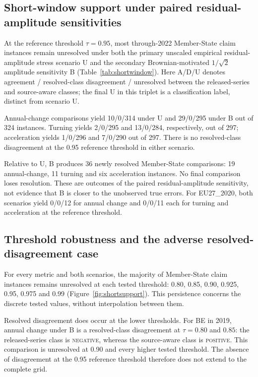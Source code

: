 

\subsection{Short-window support under paired residual-amplitude sensitivities}

At the reference threshold $\tau=0.95$, most through-2022 Member-State claim instances remain unresolved under both the primary unscaled empirical residual-amplitude stress scenario U and the secondary Brownian-motivated $1/\sqrt{2}$ amplitude sensitivity B (Table~\ref{tab:shortwindow}). Here A/D/U denotes agreement / resolved-class disagreement / unresolved between the released-series and source-aware classes; the final U in this triplet is a classification label, distinct from scenario U.

Annual-change comparisons yield 10/0/314 under U and 29/0/295 under B out of 324 instances. Turning yields 2/0/295 and 13/0/284, respectively, out of 297; acceleration yields 1/0/296 and 7/0/290 out of 297. There is no resolved-class disagreement at the 0.95 reference threshold in either scenario.

Relative to U, B produces 36 newly resolved Member-State comparisons: 19 annual-change, 11 turning and six acceleration instances. No final comparison loses resolution. These are outcomes of the paired residual-amplitude sensitivity, not evidence that B is closer to the unobserved true errors. For EU27\_2020, both scenarios yield 0/0/12 for annual change and 0/0/11 each for turning and acceleration at the reference threshold.



\subsection{Threshold robustness and the adverse resolved-disagreement case}

For every metric and both scenarios, the majority of Member-State claim instances remains unresolved at each tested threshold: 0.80, 0.85, 0.90, 0.925, 0.95, 0.975 and 0.99 (Figure~\ref{fig:shortsupport}). This persistence concerns the discrete tested values, without interpolation between them.

Resolved disagreement does occur at the lower thresholds. For BE in 2019, annual change under B is a resolved-class disagreement at $\tau=0.80$ and $0.85$: the released-series class is \textsc{negative}, whereas the source-aware class is \textsc{positive}. This comparison is unresolved at 0.90 and every higher tested threshold. The absence of disagreement at the 0.95 reference threshold therefore does not extend to the complete grid.

